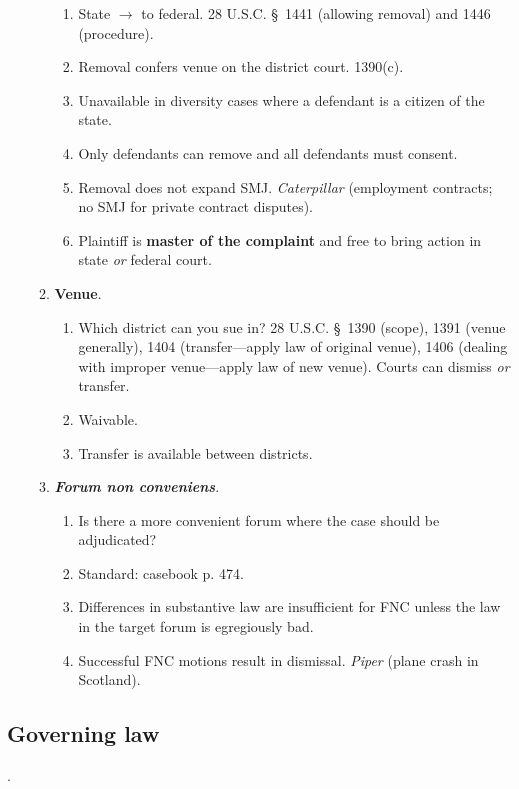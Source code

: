 \begin{enumerate}
\begin{enumerate}
\begin{enumerate}
            \item State $\rightarrow$ to federal. 28 U.S.C. \S\ 1441 (allowing 
            removal) and 1446 (procedure).
            \item Removal confers venue on the district court. 1390(c).
            \item Unavailable in diversity cases where a defendant is a 
            citizen of the state.
            \item Only defendants can remove and all defendants must consent.
            \item Removal does not expand SMJ. \emph{Caterpillar} (employment 
            contracts; no SMJ for private contract disputes).
            \item Plaintiff is \textbf{master of the complaint} and free to 
            bring action in state \emph{or} federal court.
        \end{enumerate}
        \item \textbf{Venue}.
        \begin{enumerate}
            \item Which district can you sue in? 28 U.S.C. \S\ 1390 (scope), 
            1391 (venue generally), 1404 (transfer---apply law of original 
            venue), 1406 (dealing with improper venue---apply law of new 
            venue). Courts can dismiss \emph{or} transfer.
            \item Waivable.
            \item Transfer is available between districts.
        \end{enumerate}
        \item \textbf{\emph{Forum non conveniens}}.
        \begin{enumerate}
            \item Is there a more convenient forum where the case should be 
            adjudicated?
            \item Standard: casebook p. 474.
            \item Differences in substantive law are insufficient for FNC 
            unless the law in the target forum is egregiously bad.
            \item Successful FNC motions result in dismissal. \emph{Piper} 
            (plane crash in Scotland).
        \end{enumerate}
    \end{enumerate}
\end{enumerate}

\subsection{Governing law}.

